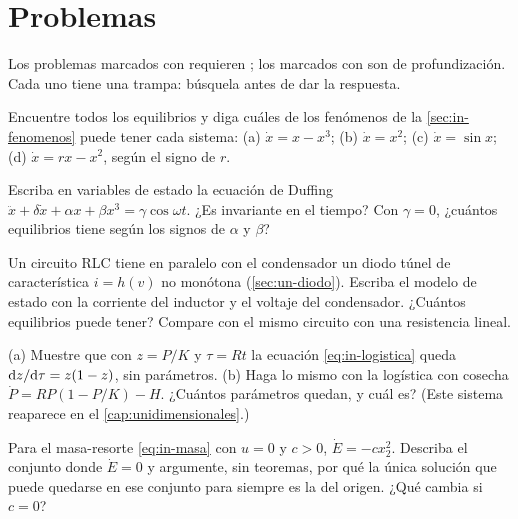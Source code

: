 \section{Problemas}
\label{sec:in-problemas}

Los problemas marcados con \etiquetaM{} requieren \matlab; los marcados con \etiquetaEstrella{} son de profundización. Cada uno tiene una trampa: búsquela antes de dar la respuesta.

\begin{problema}\label{prob:in-equilibrios}
Encuentre todos los equilibrios y diga cuáles de los fenómenos de la \cref{sec:in-fenomenos} puede tener cada sistema: (a) $\dot x=x-x^3$; (b) $\dot x=x^2$; (c) $\dot x=\sin x$; (d) $\dot x=rx-x^2$, según el signo de $r$.
\end{problema}

\begin{problema}[Duffing]\label{prob:in-duffing}
Escriba en variables de estado la ecuación de Duffing $\ddot x+\delta\dot x+\alpha x+\beta x^3=\gamma\cos\omega t$. ¿Es invariante en el tiempo? Con $\gamma=0$, ¿cuántos equilibrios tiene según los signos de $\alpha$ y $\beta$?
\end{problema}

\begin{problema}\label{prob:in-diodo}
Un circuito RLC tiene en paralelo con el condensador un diodo túnel de característica $i=h(v)$ no monótona (\cref{sec:un-diodo}). Escriba el modelo de estado con la corriente del inductor y el voltaje del condensador. ¿Cuántos equilibrios puede tener? Compare con el mismo circuito con una resistencia lineal.
\end{problema}

\begin{problema}\label{prob:in-reescalar}
(a) Muestre que con $z=P/K$ y $\tau=Rt$ la ecuación \eqref{eq:in-logistica} queda $\mathrm{d} z/\mathrm{d}\tau=z(1-z)$, sin parámetros. (b) Haga lo mismo con la logística con cosecha $\dot P=RP(1-P/K)-H$. ¿Cuántos parámetros quedan, y cuál es? (Este sistema reaparece en el \cref{cap:unidimensionales}.)
\end{problema}

\begin{problema}\label{prob:in-lasalle}
Para el masa-resorte \eqref{eq:in-masa} con $u=0$ y $c>0$, $\dot E=-cx_2^2$. Describa el conjunto donde $\dot E=0$ y argumente, sin teoremas, por qué la única solución que puede quedarse en ese conjunto para siempre es la del origen. ¿Qué cambia si $c=0$?
\end{problema}


